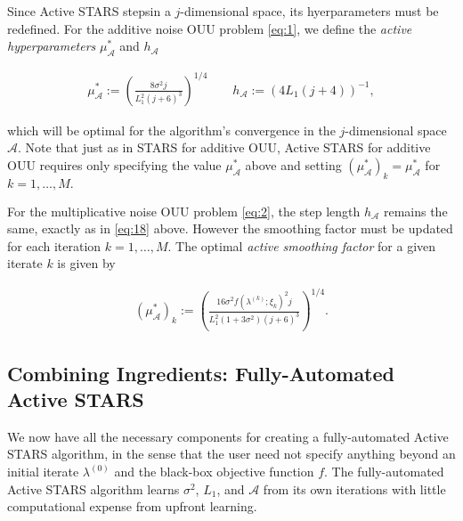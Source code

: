 \documentclass{amsart}
\newcommand{\A}{\mathcal{A}}
\begin{document}
\vspace{.25cm}

Since Active STARS stepsin a $j$-dimensional space, its hyerparameters must be redefined. For the additive noise OUU problem \eqref{eq:1}, we define the \textit{active hyperparameters} $\mu_\A^*$ and $h_\A$

\begin{eqnarray} \label{eq:18}
\mu_\A^*:=\left( \frac{8\sigma^2 j}{L_1^2(j+6)^3}\right)^{1/4} \quad \quad h_\A:=(4L_1(j+4))^{-1},
\end{eqnarray} 

\noindent which will be optimal \cite{CW} for the algorithm's convergence in the $j$-dimensional space $\A.$ Note that just as in STARS for additive OUU, Active STARS for additive OUU requires only specifying the value $\mu_\A^*$ above and setting $(\mu^*_\A)_k=\mu_\A^*$ for $k=1,\ldots, M.$

For the multiplicative noise OUU problem \eqref{eq:2}, the step length $h_\A$ remains the same, exactly as in \eqref{eq:18} above. However the smoothing factor must be updated for each iteration $k=1,\ldots, M.$ The optimal \textit{active smoothing factor} for a given iterate $k$ is given by

\begin{eqnarray} \label{eq:19}
(\mu_\A^*)_k:=\left( \frac{16 \sigma^2 f(\lambda^{(k)};\xi_k)^2 j}{L_1^2(1+3\sigma^2)(j+6)^3}\right)^{1/4}.
\end{eqnarray} 





\subsection{Combining Ingredients: Fully-Automated Active STARS} We now have all the necessary components for creating a fully-automated Active STARS algorithm, in the sense that the user need not specify anything beyond an initial iterate $\lambda^{(0)}$ and the black-box objective function $f$. The fully-automated Active STARS algorithm learns $\sigma^2$, $L_1$, and $\A$ from its own iterations with little computational expense from upfront learning.

\vspace{.25cm}
\end{document}
